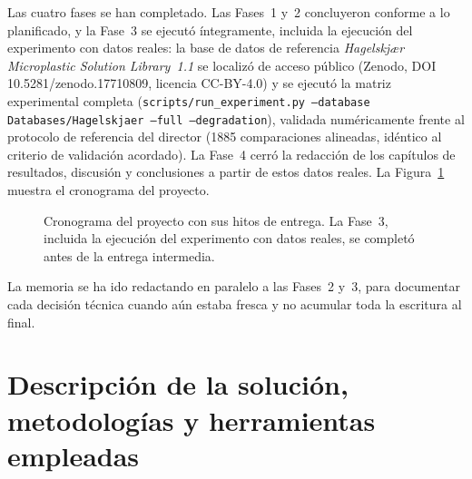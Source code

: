 Las cuatro fases se han completado. Las Fases~1 y~2 concluyeron conforme a lo planificado, y la Fase~3 se ejecutó íntegramente, incluida la ejecución del experimento con datos reales: la base de datos de referencia \emph{Hagelskjær Microplastic Solution Library~1.1} se localizó de acceso público (Zenodo, DOI 10.5281/zenodo.17710809, licencia CC-BY-4.0) y se ejecutó la matriz experimental completa (\texttt{scripts/run\_experiment.py --database Databases/Hagelskjaer --full --degradation}), validada numéricamente frente al protocolo de referencia del director (1885 comparaciones alineadas, idéntico al criterio de validación acordado). La Fase~4 cerró la redacción de los capítulos de resultados, discusión y conclusiones a partir de estos datos reales. La Figura~\ref{fig:gantt} muestra el cronograma del proyecto.

\begin{figure}[H]
\centering
{}
\caption{Cronograma del proyecto con sus hitos de entrega. La Fase~3, incluida la ejecución del experimento con datos reales, se completó antes de la entrega intermedia.}
\label{fig:gantt}
\end{figure}

La memoria se ha ido redactando en paralelo a las Fases~2 y~3, para documentar cada decisión técnica cuando aún estaba fresca y no acumular toda la escritura al final.

\section{Descripción de la solución, metodologías y herramientas empleadas}

